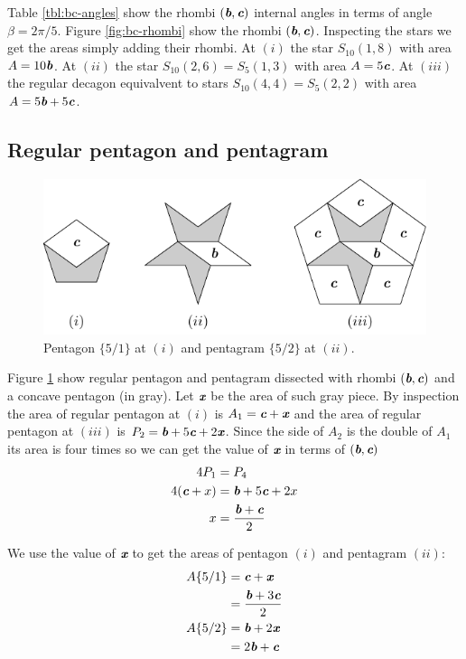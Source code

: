 \documentclass[11pt]{article}
\def\mathbi#1{\textbf{\em #1}}
\begin{document}
Table \ref {tbl:bc-angles} show the rhombi $(\mathbi{b},\mathbi{c})$ internal angles in terms of angle $\beta = 2\pi/5$.
Figure \ref{fig:bc-rhombi} show the rhombi $(\mathbi{b},\mathbi{c})$. 
Inspecting the stars we get the areas simply adding their rhombi.
At $(i)$ the star $S_{10}(1,8)$ with area $A = 10\mathbi{b}$.
At $(ii)$ the star $S_{10}(2,6) = S_5(1,3)$ with area $A = 5\mathbi{c}$.
At $(iii)$ the regular decagon equivalvent to stars $S_{10}(4,4) = S_5(2,2)$ with area $A = 5\mathbi{b} + 5\mathbi{c}$. 

\subsection{Regular pentagon and pentagram}

\begin{figure}[H]
\centering
\includegraphics[scale=1.1]{bc/penta}
\caption{Pentagon $\{5/1\}$ at $(i)$ and pentagram $\{5/2\}$ at $(ii)$.}
\label{fig:bc-penta}
\end{figure}

Figure \ref{fig:bc-penta} show regular pentagon and pentagram dissected with rhombi $(\mathbi{b},\mathbi{c})$ and a concave pentagon (in gray). Let $\mathbi{x}$ be the area of such gray piece. By inspection the area of regular pentagon at $(i)$ is $A_1 = \mathbi{c} + \mathbi{x}$ and the area of regular pentagon at $(iii)$ is $P_2 = \mathbi{b} + 5\mathbi{c} + 2\mathbi{x}$. Since the side of $A_2$ is the double of $A_1$ its area is four times so we can get the value of $\mathbi{x}$ in terms of $(\mathbi{b},\mathbi{c})$
\begin{align}
4P_1 &= P_4 \nonumber\\
4(\mathbi{c} + x) &= \mathbi{b} + 5\mathbi{c} + 2x\nonumber\\
x &= \frac{\mathbi{b} + \mathbi{c}}2
\end{align}

We use the value of $\mathbi{x}$ to get the areas of pentagon $(i)$ and pentagram $(ii)$:
\begin{align}
A\{5/1\} &= \mathbi{c} + \mathbi{x} \nonumber\\
 &= \frac{\mathbi{b} + 3\mathbi{c}}2 \\
A\{5/2\} &= \mathbi{b} + 2\mathbi{x} \nonumber\\
 &= 2\mathbi{b} + \mathbi{c}
\end{align}
\end{document}
